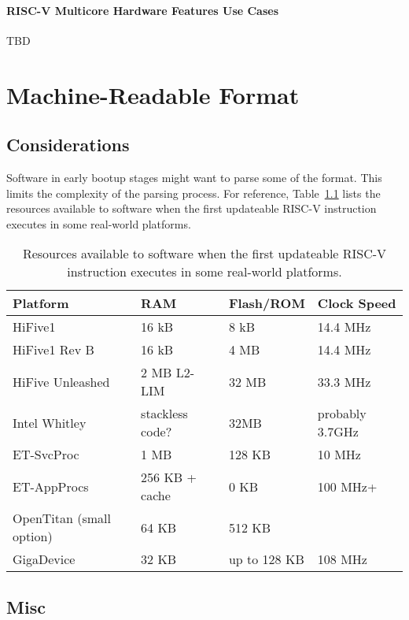 \subsubsection{RISC-V Multicore Hardware Features Use Cases}

TBD

\chapter{Machine-Readable Format}

\section{Considerations}

Software in early bootup stages might want to parse some of the format. This
limits the complexity of the parsing process. For reference,
Table~\ref{tab:earlyresources} lists the resources available to software when
the first updateable RISC-V instruction executes in some real-world platforms.

\begin{table}[H]
    \centering
    \caption{Resources available to software when the first updateable RISC-V
    instruction executes in some real-world platforms.}
    \label{tab:earlyresources}
    \begin{tabular}{|l|l|l|l}
        \hline
        Platform & RAM & Flash/ROM & Clock Speed \\
        \hline
        HiFive1 & 16 kB & 8 kB & 14.4 MHz \\
        \hline
        HiFive1 Rev B & 16 kB & 4 MB & 14.4 MHz \\
        \hline
        HiFive Unleashed & 2 MB L2-LIM & 32 MB & 33.3 MHz \\
        \hline
        Intel Whitley & stackless code? & 32MB & probably 3.7GHz \\
        \hline
        ET-SvcProc & 1 MB & 128 KB & 10 MHz \\
        \hline
        ET-AppProcs & 256 KB + cache & 0 KB & 100 MHz+ \\
        \hline
        OpenTitan (small option) & 64 KB & 512 KB & \\
        \hline
        GigaDevice & 32 KB & up to 128 KB & 108 MHz \\
        \hline
    \end{tabular}
\end{table}

\section{Misc}

